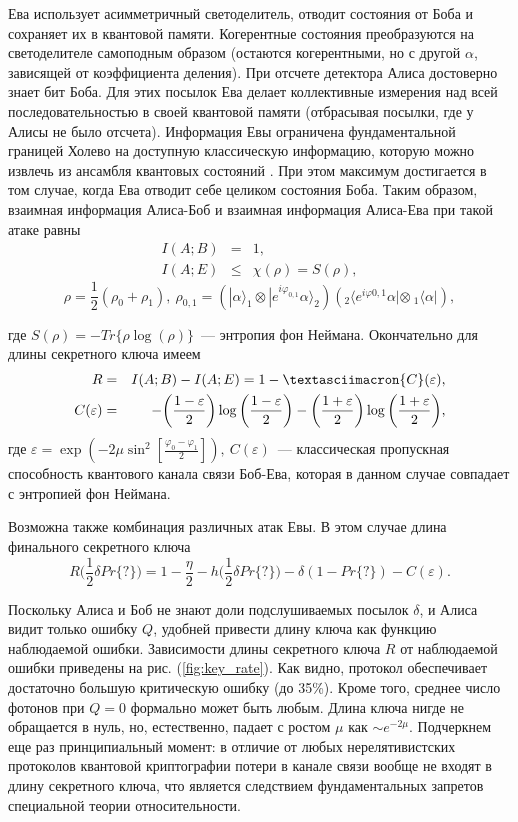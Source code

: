 Ева использует асимметричный светоделитель, отводит состояния от Боба и сохраняет их в квантовой памяти. Когерентные состояния преобразуются на светоделителе самоподным образом (остаются когерентными, но с другой $\alpha$, зависящей от коэффициента деления). 
При отсчете детектора Алиса достоверно знает бит Боба. Для этих посылок Ева делает коллективные измерения над всей последовательностью в своей квантовой памяти (отбрасывая посылки, где у Алисы не было отсчета).
Информация Евы ограничена фундаментальной границей Холево на доступную классическую информацию, которую можно извлечь из ансамбля квантовых состояний \cite{holevo2002Introtoquathe}. При этом максимум достигается в том случае, когда Ева отводит себе целиком состояния Боба. Таким образом, взаимная информация Алиса-Боб и взаимная информация Алиса-Ева при такой атаке равны
\begin{eqnarray*}
  I(A;B) &=& 1, \\
  I(A;E) &\leq& \chi(\rho) = S(\rho),  
\end{eqnarray*}
\begin{equation*}
  \rho = \frac{1}{2}(\rho_0 + \rho_1),~
  \rho_{0,1} = (|\alpha \rangle_1 \otimes | e^{i\varphi_{0,1}}\alpha\rangle_2)
	      ({}_2\langle e^{i\varphi{0,1}}\alpha | \otimes~{}_1 \langle \alpha |),
\end{equation*}

где $S(\rho) = -Tr\{\rho \log (\rho)\}$~--- энтропия фон Неймана.
Окончательно для длины секретного ключа имеем
\begin{eqnarray*}
  R &=& I(A;B) - I(A;E) = 1 - \textasciimacron{C}(\varepsilon),\\  
  C(\varepsilon) &=& -\bigg(\frac{1-\varepsilon}{2}\bigg)\log\bigg(\frac{1-\varepsilon}{2}\bigg) - \bigg(\frac{1+\varepsilon}{2}\bigg)\log\bigg(\frac{1+\varepsilon}{2}\bigg),
\end{eqnarray*}
где $\varepsilon = \exp(-2\mu\sin^2[\frac{\varphi_0 - \varphi_1}{2}]),~C(\varepsilon)$~--- классическая пропускная способность квантового канала связи Боб-Ева, которая в данном случае совпадает с энтропией фон Неймана.

Возможна также комбинация различных атак Евы. В этом случае длина финального секретного ключа
\begin{equation*}
  R\bigg(\frac{1}{2}\delta Pr\{?\}\bigg) = 1 - \frac{\eta}{2} - h\bigg(\frac{1}{2}\delta Pr\{?\}\bigg) - \delta(1 - Pr\{?\}) - C(\varepsilon).
\end{equation*}

Поскольку Алиса и Боб не знают доли подслушиваемых посылок $\delta$, и Алиса видит только ошибку $Q$, удобней привести длину ключа как функцию наблюдаемой ошибки. Зависимости длины секретного ключа $R$ от наблюдаемой ошибки приведены на рис. (\ref{fig:key_rate}). Как видно, протокол обеспечивает достаточно большую критическую ошибку (до 35\%). Кроме того, среднее число фотонов при $Q=0$ формально может быть любым. Длина ключа нигде не обращается в нуль, но, естественно, падает с ростом $\mu$ как $\sim e^{-2\mu}$. Подчеркнем еще раз принципиальный момент: в отличие от любых нерелятивистских протоколов квантовой криптографии потери в канале связи вообще не входят в длину секретного ключа, что является следствием фундаментальных запретов специальной теории относительности.
\clearpage
